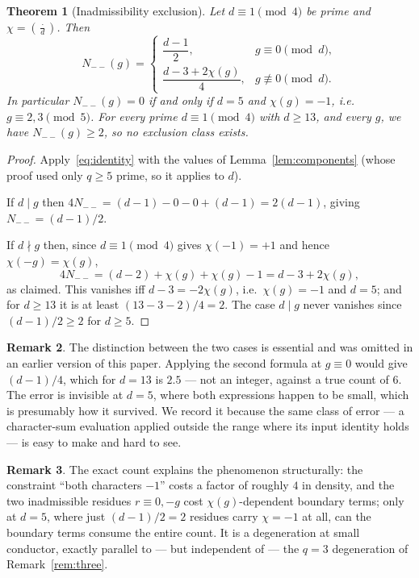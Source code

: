 \documentclass[11pt,reqno]{amsart}
\theoremstyle{plain}
\newtheorem{theorem}{Theorem}
\theoremstyle{definition}
\newtheorem{remark}[theorem]{Remark}
\newcommand{\Leg}[2]{\left(\frac{#1}{#2}\right)}
\begin{document}
\begin{theorem}[Inadmissibility exclusion]
\label{thm:inadmissible}
Let $d \equiv 1 \pmod 4$ be prime and $\chi = \Leg{\cdot}{d}$. Then
\[
  N_{--}(g) =
  \begin{cases}
    \dfrac{d-1}{2}, & g \equiv 0 \pmod d,\\[8pt]
    \dfrac{d - 3 + 2\chi(g)}{4}, & g \not\equiv 0 \pmod d.
  \end{cases}
\]
In particular $N_{--}(g) = 0$ if and only if $d = 5$ and $\chi(g) = -1$,
i.e.\ $g \equiv 2, 3 \pmod 5$. For every prime $d \equiv 1 \pmod 4$ with
$d \ge 13$, and every $g$, we have $N_{--}(g) \ge 2$, so no exclusion class
exists.
\end{theorem}

\begin{proof}
Apply~\eqref{eq:identity} with the values of Lemma~\ref{lem:components} (whose
proof used only $q \ge 5$ prime, so it applies to $d$).

If $d \mid g$ then $4N_{--} = (d-1) - 0 - 0 + (d-1) = 2(d-1)$, giving
$N_{--} = (d-1)/2$.

If $d \nmid g$ then, since $d \equiv 1 \pmod 4$ gives $\chi(-1) = +1$ and hence
$\chi(-g) = \chi(g)$,
\[
  4 N_{--} = (d-2) + \chi(g) + \chi(g) - 1 = d - 3 + 2\chi(g),
\]
as claimed. This vanishes iff $d - 3 = -2\chi(g)$, i.e.\ $\chi(g) = -1$ and
$d = 5$; and for $d \ge 13$ it is at least $(13-3-2)/4 = 2$. The case
$d \mid g$ never vanishes since $(d-1)/2 \ge 2$ for $d \ge 5$.
\end{proof}

\begin{remark}
\label{rem:hypothesis}
The distinction between the two cases is essential and was omitted in an
earlier version of this paper. Applying the second formula at $g \equiv 0$
would give $(d-1)/4$, which for $d = 13$ is $2.5$ --- not an integer, against a
true count of $6$. The error is invisible at $d = 5$, where both expressions
happen to be small, which is presumably how it survived. We record it because
the same class of error --- a character-sum evaluation applied outside the
range where its input identity holds --- is easy to make and hard to see.
\end{remark}

\begin{remark}
The exact count explains the phenomenon structurally: the constraint
``both characters $-1$'' costs a factor of roughly $4$ in density, and the two
inadmissible residues $r \equiv 0, -g$ cost $\chi(g)$-dependent boundary
terms; only at $d = 5$, where just $(d-1)/2 = 2$ residues carry $\chi = -1$ at
all, can the boundary terms consume the entire count. It is a degeneration at
small conductor, exactly parallel to --- but independent of --- the $q = 3$
degeneration of Remark~\ref{rem:three}.
\end{remark}
\end{document}
